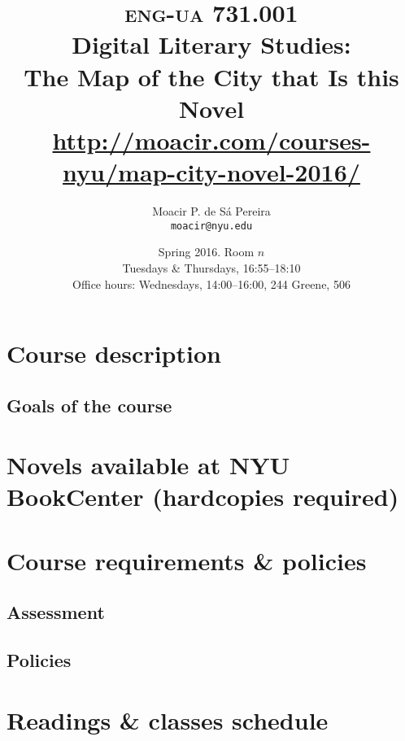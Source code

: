 \documentclass[10pt,article,oneside]{memoir}
\makeatletter
\def\myauthor{Author}
\def\mytitle{Title}
\def\myaddress{}
\def\myemail{}
\def\mycoursecode{}
\def\mycoursename{}
\def\mycoursetime{}
\def\mycourseurl{}
\def\myterm{}
\def\myofficehours{}
\def\mycoursecode{eng-ua 731.001}
\def\mycoursename{Digital Literary Studies:\\ The Map of the City that Is this Novel}
\def\myterm{Spring 2016}
\def\myaddress{Room $n$}
\def\myemail{moacir@nyu.edu}
\def\myauthor{Moacir P. de Sá Pereira}
\def\mytitle{{\normalsize \textsc{\mycoursecode}\\} \HUGE \mycoursename}
\def\mycoursetime{Tuesdays \& Thursdays, 16:55--18:10}
\def\mycourseurl{http://moacir.com/courses-nyu/map-city-novel-2016/}
\def\myofficehours{Wednesdays, 14:00--16:00, 244 Greene, 506}
\makeatother
\begin{document}
 \setsansfont[Mapping=tex-text]{Helvetica} 
 \setmonofont[Mapping=tex-text,Scale=0.8]{DejaVu Sans Mono}

\title{\LARGE \mytitle \\ \Large\url{\mycourseurl}}     
\author{\Large\myauthor\\ \small\texttt{\noindent\myemail}}
\date{\myterm. \myaddress \\ \mycoursetime \\ \small Office hours: \myofficehours}

\maketitle


\section*{Course description}


\subsection*{Goals of the course}

     
\section*{Novels available at NYU BookCenter \small (hardcopies required)}

	
\section*{Course requirements \& policies}

  \subsection*{Assessment}
  

	\subsection*{Policies}
	

\newpage

\section*{Readings \& classes schedule}


\newpage


\newpage
\printbibliography 
\end{document}
